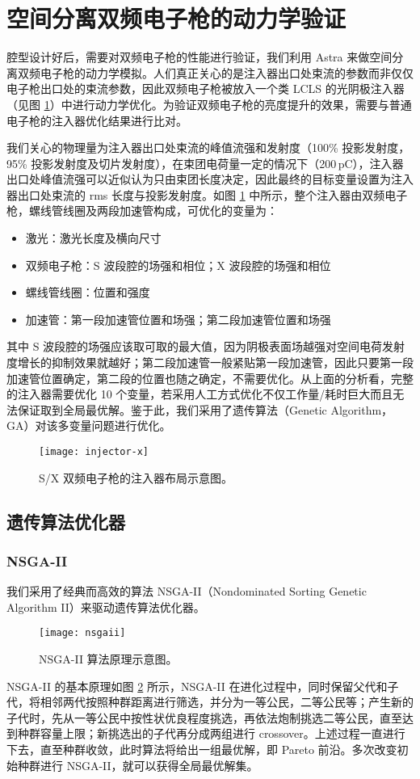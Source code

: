 \section{空间分离双频电子枪的动力学验证}
腔型设计好后，需要对双频电子枪的性能进行验证，我们利用 Astra 来做空间分离双频电子枪的动力学模拟。人们真正关心的是注入器出口处束流的参数而非仅仅电子枪出口处的束流参数，因此双频电子枪被放入一个类 LCLS 的光阴极注入器（见图 \ref{fig:injector-x}）中进行动力学优化。为验证双频电子枪的亮度提升的效果，需要与普通电子枪的注入器优化结果进行比对。

我们关心的物理量为注入器出口处束流的峰值流强和发射度（100\% 投影发射度，95\% 投影发射度及切片发射度），在束团电荷量一定的情况下（200\,pC），注入器出口处峰值流强可以近似认为只由束团长度决定，因此最终的目标变量设置为注入器出口处束流的 rms 长度与投影发射度。如图 \ref{fig:injector-x} 中所示，整个注入器由双频电子枪，螺线管线圈及两段加速管构成，可优化的变量为：
\begin{itemize}
\item {\sf 激光}：激光长度及横向尺寸
\item {\sf 双频电子枪}：S 波段腔的场强和相位；X 波段腔的场强和相位
\item {\sf 螺线管线圈}：位置和强度
\item {\sf 加速管}：第一段加速管位置和场强；第二段加速管位置和场强
\end{itemize}
其中 S 波段腔的场强应该取可取的最大值，因为阴极表面场越强对空间电荷发射度增长的抑制效果就越好；第二段加速管一般紧贴第一段加速管，因此只要第一段加速管位置确定，第二段的位置也随之确定，不需要优化。从上面的分析看，完整的注入器需要优化 10 个变量，若采用人工方式优化不仅工作量/耗时巨大而且无法保证取到全局最优解。鉴于此，我们采用了遗传算法（Genetic Algorithm，GA）对该多变量问题进行优化。
\begin{figure}[htbp]
	\centering
	\texttt{[image: injector-x]}	
	\caption{S/X 双频电子枪的注入器布局示意图。}
	\label{fig:injector-x}
\end{figure}

\subsection{遗传算法优化器}
\subsubsection{NSGA-II}
我们采用了经典而高效的算法 NSGA-II（Nondominated Sorting Genetic Algorithm II）来驱动遗传算法优化器。
\begin{figure}[htbp]
	\centering
	\texttt{[image: nsgaii]}	
	\caption{NSGA-II 算法原理示意图。}
	\label{fig:nsgaii}
\end{figure}
NSGA-II 的基本原理如图 \ref{fig:nsgaii} 所示，NSGA-II 在进化过程中，同时保留父代和子代，将相邻两代按照种群距离进行筛选，并分为一等公民，二等公民等；产生新的子代时，先从一等公民中按性状优良程度挑选，再依法炮制挑选二等公民，直至达到种群容量上限；新挑选出的子代再分成两组进行 crossover。上述过程一直进行下去，直至种群收敛，此时算法将给出一组最优解，即 Pareto 前沿。多次改变初始种群进行 NSGA-II，就可以获得全局最优解集。

